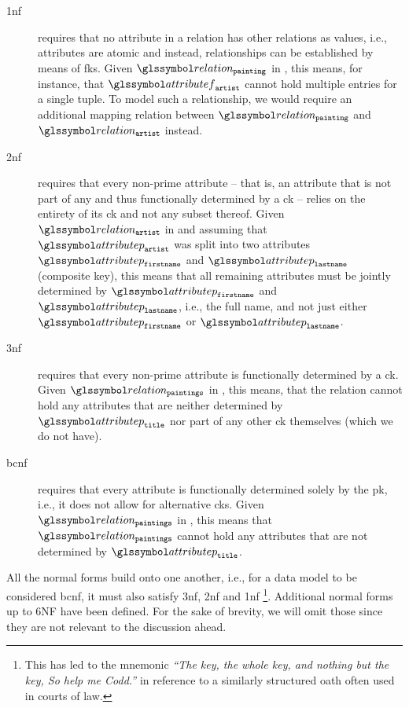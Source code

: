 \begin{description}
    \item[\acrfull{1nf}] requires that no attribute in a relation has other relations as values, i.e., attributes are atomic and instead, relationships can be established by means of \acrshort{fk}s. Given $\relation_{\mathtt{painting}}$ in , this means, for instance, that $\attributef_{\mathtt{artist}}$ cannot hold multiple entries for a single tuple. To model such a relationship, we would require an additional mapping relation between $\relation_{\mathtt{painting}}$ and $\relation_{\mathtt{artist}}$ instead.
   
    \item[\acrfull{2nf}] requires that every non-prime attribute -- that is, an attribute that is not part of any and thus functionally determined by a \acrshort{ck} -- relies on the entirety of its \acrshort{ck} and not any subset thereof. Given $\relation_{\mathtt{artist}}$ in  and assuming that  $\attributep_{\mathtt{artist}}$ was split into two attributes $\attributep_{\mathtt{firstname}}$ and $\attributep_{\mathtt{lastname}}$ (composite key), this means that all remaining attributes must be jointly determined by $\attributep_{\mathtt{firstname}}$ and $\attributep_{\mathtt{lastname}}$, i.e., the full name, and not just either $\attributep_{\mathtt{firstname}}$ or $\attributep_{\mathtt{lastname}}$.
     
    \item[\acrfull{3nf}] requires that every non-prime attribute is functionally determined by a \acrshort{ck}. Given $\relation_{\mathtt{paintings}}$ in , this means, that the relation cannot hold any attributes that are neither determined by $\attributep_{\mathtt{title}}$ nor part of any other \acrshort{ck} themselves (which we do not have).
    
    \item[\acrfull{bcnf}] requires that every attribute is functionally determined solely by the \acrshort{pk}, i.e., it does not allow for alternative \acrshort{ck}s. Given $\relation_{\mathtt{paintings}}$ in , this means that $\relation_{\mathtt{paintings}}$  cannot hold any attributes that are not determined by $\attributep_{\mathtt{title}}$.

\end{description}

All the normal forms build onto one another, i.e., for a data model to be considered \acrshort{bcnf}, it must also satisfy \acrshort{3nf}, \acrshort{2nf} and \acrshort{1nf} \footnote{This has led to the mnemonic \emph{``The key, the whole key, and nothing but the key, So help me Codd.''} in reference to a similarly structured oath often used in courts of law.}. Additional normal forms up to 6NF have been defined. For the sake of brevity, we will omit those since they are not relevant to the discussion ahead.


